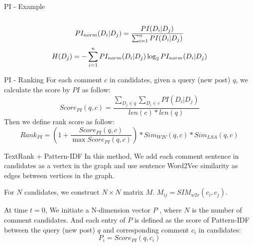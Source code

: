 \documentclass[aspectratio=169]{beamer} %
\newcommand\Fontvi{\fontsize{8}{7.2}\selectfont}
\begin{document}
\begin{frame}{PI - Example}
\begin{columns}[T]
\begin{column}{.48\textwidth}
        
      \end{column}%

      \end{columns}
      
      \begin{equation}
      \Fontvi
      PI_{norm}(D_i|D_j) = \frac{PI(D_i|D_j)}{\sum_{i=1}^n{PI(D_i|D_j)}}
      \end{equation}
      \begin{equation}
      \Fontvi
      H(D_j) = - \sum_{i=1}^n{PI_{norm}(D_i|D_j)\log_2{PI_{norm}(D_i|D_j)}}
      \end{equation}

    \end{frame}

    \begin{frame}{PI - Ranking}
      For each comment $c$ in candidates, given a query (new post) $q$, we 
      calculate the score by $PI$ as follow:
      \begin{equation}
        Score_{PI}(q, c) = \frac{\sum_{D_j \in q}{\sum_{D_i \in c}{PI(D_i|D_j)}}}{len(c) * len(q)}
      \end{equation}
      Then we define rank score as follow:
      \begin{equation}
        Rank_{PI} = (1 + \frac{Score_{PI}(q, c)}{\max{Score_{PI}(q, c)}}) * Sim_{W2V}(q, c)*Sim_{LSA}(q, c)  
      \end{equation}
    \end{frame}

    \begin{frame}{TextRank + Pattern-IDF}
      In this method, We add each comment sentence in candidates as a vertex in the graph and use sentence Word2Vec similarity as edges between vertices in the graph.

      For $N$ candidates, we construct $ N \times N $ matrix $M$. $M_{ij} = SIM_{w2v}(c_i, c_j)$. 

      At time $t = 0$, We initiate a N-dimension vector $P$ , where $N$ is the number 
      of comment candidates. And each entry of $P$ is defined as the score of Pattern-IDF between the query (new post) $q$ and corresponding comment $c_i$ in candidates:
      \begin{equation}
        P_i = Score_{PI}(q, c_i)
      \end{equation}
    \end{frame}
\end{document}
